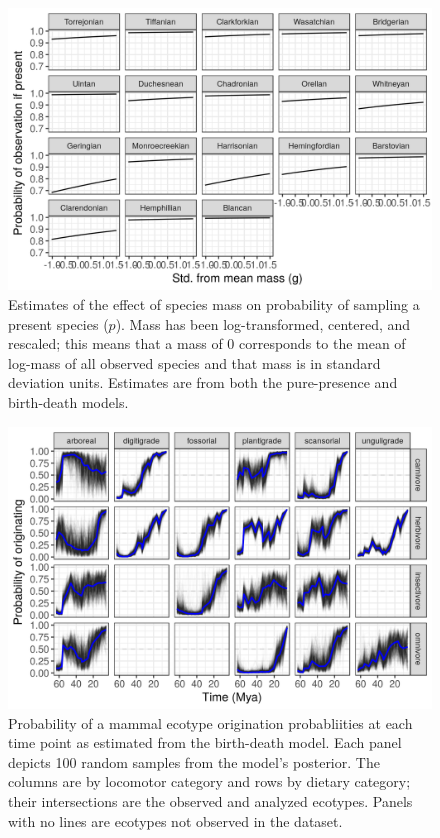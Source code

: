 \documentclass[12pt,letterpaper]{article}
\begin{document}
\begin{figure}[ht]
  \includegraphics[width=\textwidth,height=0.4\textheight,keepaspectratio=true]{figure/mass_on_pres_bd}
  \caption[Estimates of the effect of mass on observation probability]{Estimates of the effect of species mass on probability of sampling a present species (\(p\)). Mass has been log-transformed, centered, and rescaled; this means that a mass of 0 corresponds to the mean of log-mass of all observed species and that mass is in standard deviation units. Estimates are from both the pure-presence and birth-death models.}
  \label{fig:mass_observe}
\end{figure}


\begin{figure}[ht]
  \centering
  \includegraphics[width=\textwidth,height=0.4\textheight,keepaspectratio=true]{figure/ecotype_origin_bd}
  \caption[Ecotype origination probability estimated from the birth-death model]{Probability of a mammal ecotype origination probabliities at each time point as estimated from the birth-death model. Each panel depicts 100 random samples from the model's posterior. The columns are by locomotor category and rows by dietary category; their intersections are the observed and analyzed ecotypes. Panels with no lines are ecotypes not observed in the dataset.}
  \label{fig:eco_origin}
\end{figure}
\end{document}
